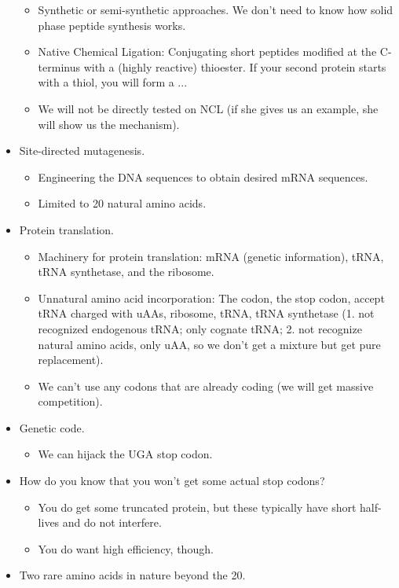 \documentclass[../notes.tex]{subfiles}
\begin{document}
\begin{itemize}
\begin{itemize}
        \item Synthetic or semi-synthetic approaches. We don't need to know how solid phase peptide synthesis works.
        \item Native Chemical Ligation: Conjugating short peptides modified at the C-terminus with a (highly reactive) thioester. If your second protein starts with a thiol, you will form a ...
        \item We will not be directly tested on NCL (if she gives us an example, she will show us the mechanism).
    \end{itemize}
    \item Site-directed mutagenesis.
    \begin{itemize}
        \item Engineering the DNA sequences to obtain desired mRNA sequences.
        \item Limited to 20 natural amino acids.
    \end{itemize}
    \item Protein translation.
    \begin{itemize}
        \item Machinery for protein translation: mRNA (genetic information), tRNA, tRNA synthetase, and the ribosome.
        \item Unnatural amino acid incorporation: The codon, the stop codon, accept tRNA charged with uAAs, ribosome, tRNA, tRNA synthetase (1. not recognized endogenous tRNA; only cognate tRNA; 2. not recognize natural amino acids, only uAA, so we don't get a mixture but get pure replacement).
        \item We can't use any codons that are already coding (we will get massive competition).
    \end{itemize}
    \item Genetic code.
    \begin{itemize}
        \item We can hijack the UGA stop codon.
    \end{itemize}
    \item How do you know that you won't get some actual stop codons?
    \begin{itemize}
        \item You do get some truncated protein, but these typically have short half-lives and do not interfere.
        \item You do want high efficiency, though.
    \end{itemize}
    \item Two rare amino acids in nature beyond the 20.

\end{itemize}
\end{document}
